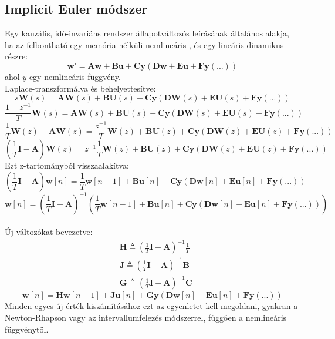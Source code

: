 \subsection{Implicit Euler módszer}
Egy kauzális, idő-invariáns rendszer állapotváltozós leírásának általános alakja, ha az felbontható egy memória nélküli nemlineáris-, és egy lineáris dinamikus részre:
\begin{equation}
    \mathbf{w}'=\mathbf{Aw}+\mathbf{Bu}+\mathbf{Cy(\mathbf{Dw}+\mathbf{Eu}+\mathbf{Fy}(...))}
\end{equation}
ahol $y$ egy nemlineáris függvény.\\
Laplace-transzformálva és behelyettesítve:
\begin{equation}
    s\mathbf{W}(s)=\mathbf{AW}(s)+\mathbf{BU}(s)+\mathbf{Cy}(\mathbf{DW}(s)+\mathbf{EU}(s)+\mathbf{Fy}(...))
\end{equation}
\begin{equation}
    \frac{1-z^{-1}}{T}\mathbf{W}(s)=\mathbf{AW}(s)+\mathbf{BU}(s)+\mathbf{Cy}(\mathbf{DW}(s)+\mathbf{EU}(s)+\mathbf{Fy}(...))
\end{equation}
\begin{equation}
    \frac{1}{T}\mathbf{W}(z)-\mathbf{AW}(z)=\frac{z^{-1}}{T}\mathbf{W}(z)+\mathbf{BU}(z)+\mathbf{Cy}(\mathbf{DW}(z)+\mathbf{EU}(z)+\mathbf{Fy}(...))
\end{equation}
\begin{equation}
    (\frac{1}{T}\mathbf{I}-\mathbf{A})\mathbf{W}(z)=z^{-1}\frac{1}{T}\mathbf{W}(z)+\mathbf{BU}(z)+\mathbf{Cy}(\mathbf{DW}(z)+\mathbf{EU}(z)+\mathbf{Fy}(...))
\end{equation}
Ezt z-tartományból visszaalakítva:
\begin{equation}
    (\frac{1}{T}\mathbf{I}-\mathbf{A})\mathbf{w}[n]=\frac{1}{T}\mathbf{w}[n-1]+\mathbf{Bu}[n]+\mathbf{Cy}(\mathbf{Dw}[n]+\mathbf{Eu}[n]+\mathbf{Fy}(...))
\end{equation}
\begin{equation}
    \mathbf{w}[n]=(\frac{1}{T}\mathbf{I}-\mathbf{A})^{-1}(\frac{1}{T}\mathbf{w}[n-1]+\mathbf{Bu}[n]+\mathbf{Cy}(\mathbf{Dw}[n]+\mathbf{Eu}[n]+\mathbf{Fy}(...)))
\end{equation}\\
Új változókat bevezetve:
\begin{eqnarray}
    &\mathbf{H}\triangleq (\frac{1}{T}\mathbf{I}-\mathbf{A})^{-1}\frac{1}{T}\\
    &\mathbf{J}\triangleq (\frac{1}{T}\mathbf{I}-\mathbf{A})^{-1}\mathbf{B}\\
    &\mathbf{G}\triangleq (\frac{1}{T}\mathbf{I}-\mathbf{A})^{-1}\mathbf{C}
\end{eqnarray}
\begin{equation}
    \mathbf{w}[n]=\mathbf{Hw}[n-1]+\mathbf{Ju}[n]+\mathbf{Gy}(\mathbf{Dw}[n]+\mathbf{Eu}[n]+\mathbf{Fy}(...))
\end{equation}
Minden egyes új érték kiszámításához ezt az egyenletet kell megoldani, gyakran a Newton-Rhapson vagy az intervallumfelezés módszerrel, függően a nemlineáris függvénytől. 

